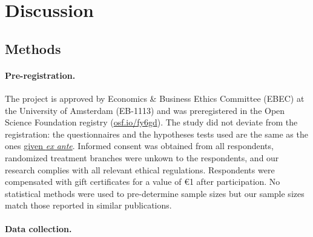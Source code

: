 \documentclass[12pt,english]{article}
\begin{document}
\begin{bibunit}
\section{Discussion} %


  \begin{small} %
\section*{\normalsize Methods}\label{sec:methods} %

\paragraph{\small Pre-registration.}
The project is approved by Economics \& Business Ethics Committee (EBEC) at the University of Amsterdam (EB-1113) and %
was preregistered in the Open Science Foundation registry (\href{https://osf.io/fy6gd}{osf.io/fy6gd}). The study did not deviate from the registration: the questionnaires and the hypotheses tests used are the same as the ones \href{https://osf.io/2b6vq}{given \textit{ex ante}}. Informed consent was obtained from all respondents, randomized treatment branches were unkown to the respondents, and our research complies with all relevant ethical regulations. Respondents were compensated with gift certificates for a value of \euro{}1 after participation. No statistical methods were used to pre-determine sample sizes but our sample sizes match those reported in similar publications.\citep{dechezlepretre_fighting_2025,issp_international_2010,beiser-mcgrath_could_2019,sivonen_attitudes_2022,douenne_yellow_2022}

\paragraph{\small Data collection.} %


\end{small}
\end{bibunit}
\end{document}
